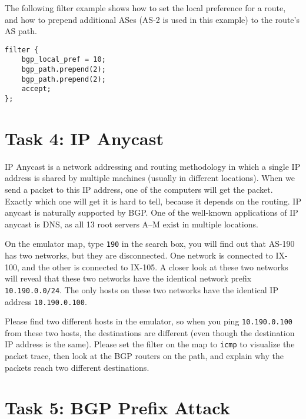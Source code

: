 The following filter example shows how to set the
local preference for a route, and how to prepend 
additional ASes (AS-2 is used in this example) to 
the route's AS path.

\begin{lstlisting}
filter {
    bgp_local_pref = 10;
    bgp_path.prepend(2);
    bgp_path.prepend(2);
    accept;
};
\end{lstlisting}
 


\section{Task 4: IP Anycast} 

IP Anycast is a network addressing and routing methodology in which a single
IP address is shared by multiple machines (usually in different locations).
When we send a packet to this IP address, one of the computers will get 
the packet. Exactly which one will get it is hard to tell, because it depends
on the routing. IP anycast is naturally supported by BGP. 
One of the well-known applications of IP anycast is DNS, 
as all 13 root servers A–M exist in multiple locations. 


On the emulator map, type \texttt{190} in the search box, you will find 
out that AS-190 has two networks, but they are disconnected. One network
is connected to IX-100, and the other is connected to IX-105. A closer 
look at these two networks will reveal that these two networks have the 
identical network prefix \texttt{10.190.0.0/24}. The only hosts on
these two networks have the identical IP address \texttt{10.190.0.100}. 

Please find two different hosts in the emulator, so 
when you ping \texttt{10.190.0.100} from these two hosts, 
the destinations are different (even though the destination
IP address is the same). Please set the filter on the map to
\texttt{icmp} to visualize the packet trace, then 
look at the BGP routers on the path, and explain why
the packets reach two different destinations. 

 

\section{Task 5: BGP Prefix Attack} 

